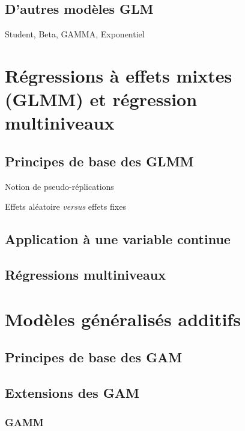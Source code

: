 \documentclass[
  11pt,
  french,
]{book}
\begin{document}
\hypertarget{sect063}{%
\section{D'autres modèles GLM}\label{sect063}}

Student, Beta, GAMMA, Exponentiel

\hypertarget{chap07}{%
\chapter{Régressions à effets mixtes (GLMM) et régression multiniveaux}\label{chap07}}

\hypertarget{sect071}{%
\section{Principes de base des GLMM}\label{sect071}}

Notion de pseudo-réplications

Effets aléatoire \emph{versus} effets fixes

\hypertarget{sect072}{%
\section{Application à une variable continue}\label{sect072}}

\hypertarget{sect073}{%
\section{Régressions multiniveaux}\label{sect073}}

\hypertarget{chap08}{%
\chapter{Modèles généralisés additifs}\label{chap08}}

\hypertarget{sect081}{%
\section{Principes de base des GAM}\label{sect081}}

\hypertarget{sect082}{%
\section{Extensions des GAM}\label{sect082}}

\hypertarget{sect0821}{%
\subsection{GAMM}\label{sect0821}}
\end{document}

